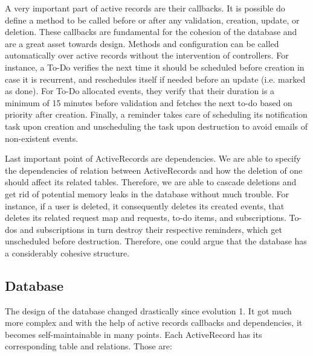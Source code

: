 \documentclass[11pt]{article}
\begin{document}
A very important part of active records are their callbacks. It is possible do define a method to be called before or after any validation, creation, update, or deletion. These callbacks are fundamental for the cohesion of the database and are a great asset towards design. Methods and configuration can be called automatically over active records without the intervention of controllers. For instance, a To-Do verifies the next time it should be scheduled before creation in case it is recurrent, and reschedules itself if needed before an update (i.e. marked as done). For To-Do allocated events, they verify that their duration is a minimum of 15 minutes before validation and fetches the next to-do based on priority after creation. Finally, a reminder takes care of scheduling its notification task upon creation and unscheduling the task upon destruction to avoid emails of non-existent events.

Last important point of ActiveRecords are dependencies. We are able to specify the dependencies of relation between ActiveRecords and how the deletion of one should affect its related tables. Therefore, we are able to cascade deletions and get rid of potential memory leaks in the database without much trouble. For instance, if a user is deleted, it consequently deletes its created events, that deletes its related request map and requests, to-do items, and subscriptions. To-dos and subscriptions in turn destroy their respective reminders, which get unscheduled before destruction. Therefore, one could argue that the database has a considerably cohesive structure.

\subsection{Database}

The design of the database changed drastically since evolution 1. It got much more complex and with the help of active records callbacks and dependencies, it becomes self-maintainable in many points. Each ActiveRecord has its corresponding table and relations. Those are:
\end{document}
